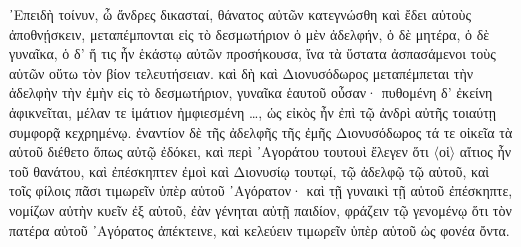 {\large
\begin{greek}
\noindent ᾿Επειδὴ τοίνυν, ὦ ἄνδρες δικασταί, θάνατος αὐτῶν κατεγνώσθη καὶ ἔδει αὐτοὺς ἀποθνῄσκειν, μεταπέμπονται εἰς τὸ δεσμωτήριον ὁ μὲν ἀδελφήν, ὁ δὲ μητέρα, ὁ δὲ γυναῖκα, ὁ δ' ἥ τις ἦν ἑκάστῳ αὐτῶν προσήκουσα, ἵνα τὰ ὕστατα ἀσπασάμενοι τοὺς αὑτῶν οὕτω τὸν βίον τελευτήσειαν. καὶ δὴ καὶ Διονυσόδωρος μεταπέμπεται τὴν ἀδελφὴν τὴν ἐμὴν εἰς τὸ δεσμωτήριον, γυναῖκα ἑαυτοῦ οὖσαν· πυθομένη δ' ἐκείνη ἀφικνεῖται, μέλαν τε ἱμάτιον ἠμφιεσμένη \dots, ὡς εἰκὸς ἦν ἐπὶ τῷ ἀνδρὶ αὐτῆς τοιαύτῃ συμφορᾷ κεχρημένῳ. ἐναντίον δὲ τῆς ἀδελφῆς τῆς ἐμῆς Διονυσόδωρος τά τε οἰκεῖα τὰ αὑτοῦ διέθετο ὅπως αὐτῷ ἐδόκει, καὶ περὶ ᾿Αγοράτου τουτουὶ ἔλεγεν ὅτι $\langle$οἱ$\rangle$ αἴτιος ἦν τοῦ θανάτου, καὶ ἐπέσκηπτεν ἐμοὶ καὶ Διονυσίῳ τουτῳί, τῷ ἀδελφῷ τῷ αὑτοῦ, καὶ τοῖς φίλοις πᾶσι τιμωρεῖν ὑπὲρ αὑτοῦ ᾿Αγόρατον· καὶ τῇ γυναικὶ τῇ αὑτοῦ ἐπέσκηπτε, νομίζων αὐτὴν κυεῖν ἐξ αὑτοῦ, ἐὰν γένηται αὐτῇ παιδίον, φράζειν τῷ γενομένῳ ὅτι τὸν πατέρα αὐτοῦ ᾿Αγόρατος ἀπέκτεινε, καὶ κελεύειν τιμωρεῖν ὑπὲρ αὑτοῦ ὡς φονέα ὄντα.

\end{greek}

}

